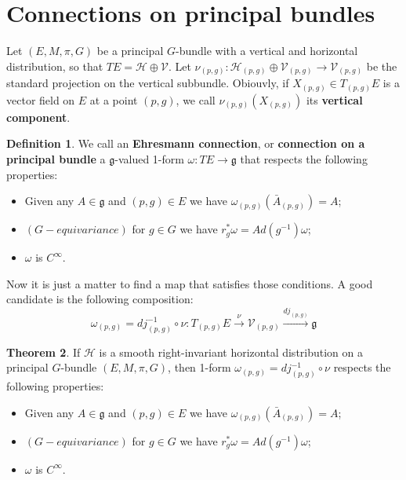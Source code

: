 \documentclass[12pt,a4paper]{report}
\theoremstyle{definition}
\newtheorem{Def}{Definition}[chapter]
\theoremstyle{Theorem}
\newtheorem{Theo}[Def]{Theorem}
\theoremstyle{definition}
\theoremstyle{definition}
\begin{document}
		\section{Connections on principal bundles}
		Let $(E,M,\pi,G)$ be a principal $G$-bundle with a vertical and horizontal distribution, so that $TE=\mathcal{H}\oplus\mathcal{V}$. Let $\nu_{(p,g)}:\mathcal{H}_{(p,g)}\oplus\mathcal{V}_{(p,g)}\rightarrow \mathcal{V}_{(p,g)}$ be the standard projection on the vertical subbundle. Obiouvly, if $X_{(p,g)}\in T_{(p,g)}E$ is a vector field on $E$ at a point $(p,g)$, we call $\nu_{(p,g)}(X_{(p,g)})$ its \textbf{vertical component}.
		\begin{Def}\label{Def_6.6}
			We call an \textbf{Ehresmann connection}, or \textbf{connection on a principal bundle} a $\mathfrak{g}$-valued 1-form $\omega:TE\rightarrow \mathfrak{g}$ that respects the following properties:
			\begin{itemize}
				\item Given any $A\in\mathfrak{g}$ and $(p,g)\in E$ we have $\omega_{(p,g)}(\bar{A}_{(p,g)})=A$;
				\item $(G-equivariance)$ for $g\in G$ we have $r^*_g\omega=Ad(g^{-1})\omega$;
				\item $\omega$ is $C^\infty$.
			\end{itemize}
		\end{Def}
		Now it is just a matter to find a map that satisfies those conditions. A good candidate is the following composition:
		$$\omega_{(p,g)}=dj_{(p,g)}^{-1}\circ \nu:T_{(p,g)}E\xrightarrow{\nu} \mathcal{V}_{(p,g)}\xrightarrow{dj_{(p,g)}}\mathfrak{g}$$
		\begin{Theo}
			If $\mathcal{H}$ is a smooth right-invariant horizontal distribution on a principal $G$-bundle $(E,M,\pi,G)$, then 1-form $\omega_{(p,g)}=dj_{(p,g)}^{-1}\circ \nu$ respects the following properties:
			\begin{itemize}
				\item Given any $A\in\mathfrak{g}$ and $(p,g)\in E$ we have $\omega_{(p,g)}(\bar{A}_{(p,g)})=A$;
				\item $(G-equivariance)$ for $g\in G$ we have $r^*_g\omega=Ad(g^{-1})\omega$;
				\item $\omega$ is $C^\infty$.
			\end{itemize}
		\end{Theo}
\end{document}
